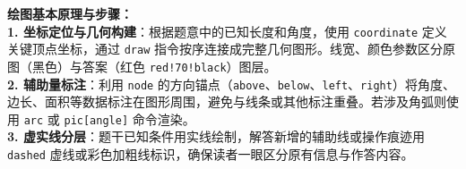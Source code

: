 \vspace{0.8cm}


\vspace{0.6cm}

{\small\color{blue!70!black}
\textbf{绘图基本原理与步骤：}\\
\textbf{1. 坐标定位与几何构建}：根据题意中的已知长度和角度，使用 \texttt{coordinate} 定义关键顶点坐标，通过 \texttt{draw} 指令按序连接成完整几何图形。线宽、颜色参数区分原图（黑色）与答案（红色 \texttt{red!70!black}）图层。\\
\textbf{2. 辅助量标注}：利用 \texttt{node} 的方向锚点（\texttt{above}、\texttt{below}、\texttt{left}、\texttt{right}）将角度、边长、面积等数据标注在图形周围，避免与线条或其他标注重叠。若涉及角弧则使用 \texttt{arc} 或 \texttt{pic[angle]} 命令渲染。\\
\textbf{3. 虚实线分层}：题干已知条件用实线绘制，解答新增的辅助线或操作痕迹用 \texttt{dashed} 虚线或彩色加粗线标识，确保读者一眼区分原有信息与作答内容。
}

\newpage
